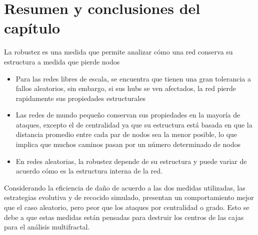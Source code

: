 \section{Resumen y conclusiones del capítulo}

La robustez es una medida que permite analizar cómo una red conserva su estructura a medida que pierde nodos

\begin{itemize}
    \item Para las redes libres de escala, se encuentra que tienen una gran tolerancia a fallos aleatorios, sin embargo, si sus hubs se ven afectados, la red pierde rapidamente sus propiedades estructurales
    \item Las redes de mundo pequeño conservan sus propiedades en la mayoría de ataques, excepto el de centralidad ya que su estructura está basada en que la distancia promedio entre cada par de nodos sea la menor posible, lo que implica que muchos caminos pasan por un número determinado de nodos
    \item En redes aleatorias, la robustez depende de su estructura y puede variar de acuerdo cómo es la estructura interna de la red.
\end{itemize}

Considerando la eficiencia de daño de acuerdo a las dos medidas utilizadas, las estrategias evolutiva y de recocido simulado, presentan un comportamiento mejor que el caso aleatorio, pero peor que los ataques por centralidad o grado. Esto se debe a que estas medidas están pensadas para destruir los centros de las cajas para el análisis multifractal.